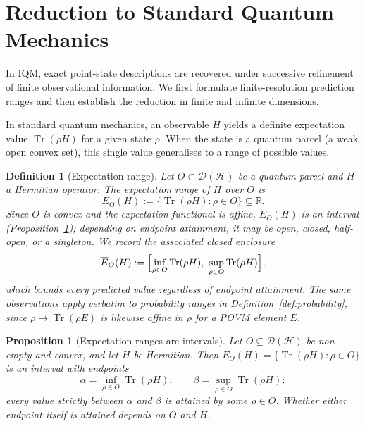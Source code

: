 \documentclass[11pt, onecolumn]{article}
\newtheorem{definition}{Definition}
\newtheorem{proposition}{Proposition}
\begin{document}
\section{Reduction to Standard Quantum Mechanics}\label{sec:reduction}

In IQM, exact point-state descriptions are recovered under successive refinement of finite observational information. We first formulate finite-resolution prediction ranges and then establish the reduction in finite and infinite dimensions.

In standard quantum mechanics, an observable \(H\) yields a definite expectation value \(\operatorname{Tr}(\rho H)\) for a given state \(\rho\). When the state is a quantum parcel (a weak open convex set), this single value generalises to a range of possible values.

\begin{definition}[Expectation range]
\label{def:expectation}
Let $O \subset \mathcal{D}(\mathcal{H})$ be a quantum parcel and $H$ a Hermitian operator. The \emph{expectation range} of $H$ over $O$ is
\[
E_O(H) := \{\operatorname{Tr}(\rho H) : \rho \in O\} \subseteq \mathbb{R}.
\]
Since $O$ is convex and the expectation functional is affine, $E_O(H)$ is an interval (Proposition~\ref{prop:expectation}); depending on endpoint attainment, it may be open, closed, half-open, or a singleton. We record the associated closed enclosure
\[
\overline E_O(H) := \Bigl[\inf_{\rho\in O}\operatorname{Tr}(\rho H),\ \sup_{\rho\in O}\operatorname{Tr}(\rho H)\Bigr],
\]
which bounds every predicted value regardless of endpoint attainment. The same observations apply verbatim to probability ranges in Definition~\ref{def:probability}, since $\rho\mapsto\operatorname{Tr}(\rho E)$ is likewise affine in $\rho$ for a POVM element $E$.
\end{definition}

\begin{proposition}[Expectation ranges are intervals]
\label{prop:expectation}
Let $O\subseteq\mathcal D(\mathcal H)$ be non-empty and convex, and let $H$ be Hermitian. Then $E_O(H)=\{\operatorname{Tr}(\rho H):\rho\in O\}$ is an interval with endpoints
\[
\alpha=\inf_{\rho\in O}\operatorname{Tr}(\rho H),
\qquad
\beta=\sup_{\rho\in O}\operatorname{Tr}(\rho H);
\]
every value strictly between $\alpha$ and $\beta$ is attained by some $\rho\in O$. Whether either endpoint itself is attained depends on $O$ and $H$.
\end{proposition}
\end{document}
